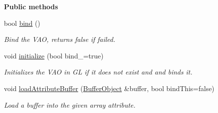 \begin{Indent}\textbf{ Public methods}\par
\begin{DoxyCompactItemize}
\item 
\mbox{\label{classrev_1_1_g_l_1_1_vertex_array_object_a080c5dce0981855f5ad0650bedbd2a0c}} 
bool \mbox{\hyperlink{classrev_1_1_g_l_1_1_vertex_array_object_a080c5dce0981855f5ad0650bedbd2a0c}{bind}} ()
\begin{DoxyCompactList}\small\item\em Bind the V\+AO, returns false if failed. \end{DoxyCompactList}\item 
\mbox{\label{classrev_1_1_g_l_1_1_vertex_array_object_adccccf9701c922d7bf1740a516ec5066}} 
void \mbox{\hyperlink{classrev_1_1_g_l_1_1_vertex_array_object_adccccf9701c922d7bf1740a516ec5066}{initialize}} (bool bind\+\_\+=true)
\begin{DoxyCompactList}\small\item\em Initializes the V\+AO in GL if it does not exist and and binds it. \end{DoxyCompactList}\item 
void \mbox{\hyperlink{classrev_1_1_g_l_1_1_vertex_array_object_aa8d8fd5f855f66d7f4727ff71f84ffa6}{load\+Attribute\+Buffer}} (\mbox{\hyperlink{classrev_1_1_g_l_1_1_buffer_object}{Buffer\+Object}} \&buffer, bool bind\+This=false)
\begin{DoxyCompactList}\small\item\em Load a buffer into the given array attribute. \end{DoxyCompactList}\end{DoxyCompactItemize}
\end{Indent}
